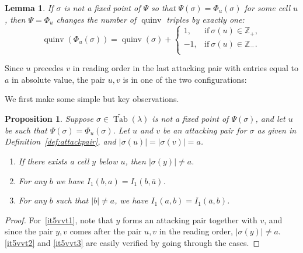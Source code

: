 \documentclass[11pt]{article}
\newtheorem{proposition}[theo]{Proposition}
\newtheorem{lemma}[theo]{Lemma}
\theoremstyle{definition}
\numberwithin{equation}{section}
\DeclareMathOperator{\PQT}{Tab}
\DeclareMathOperator{\quinv}{quinv}
\newcommand\cellL[4]{
\def\i{#1} \def\j{#2} \def\entry{#3} \def\labl{#4}
\draw (\j-1,-\i)--(\j,-\i)--(\j,-\i+1)--(\j-1,-\i+1)--(\j-1,-\i);
\node at (\j-.5,-\i+.5) {\entry};
\node at (\j-1.3,-\i+.8) {\tiny\labl};
}
\begin{document}
\begin{lemma}\label{lem:A1quinv}
If $\sigma$ is not a fixed point of $\Psi$ so that $\Psi(\sigma)=\Phi_u(\sigma)$ for some cell $u$, then $\Psi=\Phi_u$ changes the number of $\quinv$ triples by exactly one:
\[
\quinv(\Phi_u(\sigma))=\quinv(\sigma)+\begin{cases} 1,&\mbox{if}\ \sigma(u)\in\mathbb{Z}_+,\\ -1,&\mbox{if}\ \sigma(u)\in\mathbb{Z}_-.\\\end{cases}
\]
\end{lemma}

Since $u$ precedes $v$ in reading order in the last attacking pair with entries equal to $a$ in absolute value, the pair $u,v$ is in one of the two configurations:
\begin{center}
\end{center}

We first make some simple but key observations.

\begin{proposition}
\label{prop:attackpair}
Suppose $\sigma\in\widetilde{\PQT}(\lambda)$ is not a fixed point of $\Psi(\sigma)$, and let $u$ be such that $\Psi(\sigma)=\Phi_u(\sigma)$. Let $u$ and $v$ be an attacking pair for $\sigma$ as given in Definition~\ref{def:attackpair}, and $|\sigma(u)|
= |\sigma(v)| = a$.

\begin{enumerate}[label=(\arabic*)]
\item  \label{it5vvt1} If there exists a cell $y$ below $u$, then $|\sigma(y)| \neq a$.

\item \label{it5vvt2} For any $b$ we have $I_1(b,a)=I_1(b,\bar{a})$.

\item  \label{it5vvt3} For any $b$ such that $|b| \neq a$, we have $I_1(a,b)=I_1(\bar{a},b)$.
\end{enumerate}

\end{proposition}

\begin{proof}
For~\ref{it5vvt1}, note that $y$ forms an attacking pair together with $v$, and since the pair $y,v$ comes after the pair $u,v$ in the reading order, $|\sigma(y)| \neq a$. \ref{it5vvt2} and \ref{it5vvt3} are easily verified by going through the cases.
\end{proof}
\end{document}
